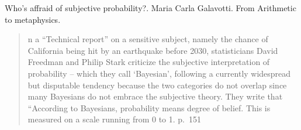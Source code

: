 

\Large{Who's affraid of subjective probability?. Maria Carla Galavotti. From Arithmetic to metaphysics.}

\begin{quote}
	n a “Technical report” on a sensitive subject, namely the chance of California being hit by an earthquake before 2030, statisticians David Freedman and Philip Stark criticize the subjective interpretation of probability – which they call ‘Bayesian’, following a currently widespread but disputable tendency because the two categories do not overlap since many Bayesians do not embrace the subjective theory. They write that “According to Bayesians, probability means degree of belief. This is measured on a scale running from 0 to 1. p.~151
\end{quote}




